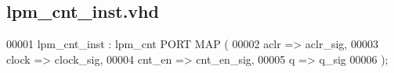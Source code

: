 \subsection{lpm\+\_\+cnt\+\_\+inst.\+vhd}
\label{ip_2lpm__counter_2lpm__cnt__inst_8vhd_source}

\begin{DoxyCode}
00001 lpm\_cnt\_inst : lpm_cnt \textcolor{keywordflow}{PORT} \textcolor{keywordflow}{MAP} (
00002         aclr     => aclr\_sig,
00003         clock    => clock\_sig,
00004         cnt_en   => cnt\_en\_sig,
00005         q    => q\_sig
00006     \textcolor{vhdlchar}{)};
\end{DoxyCode}
